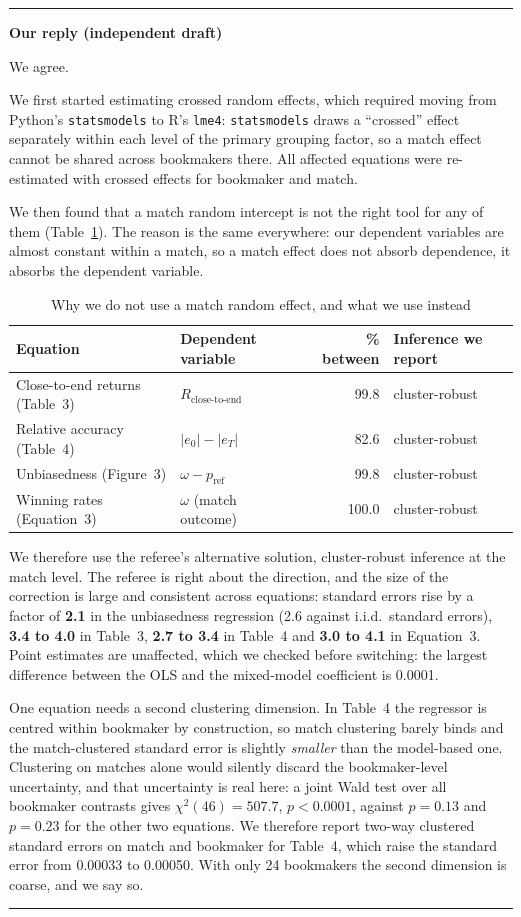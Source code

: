 \documentclass[letterpaper,12pt]{article}
\newcounter{b}
\newenvironment{ourreply}
  {\par\medskip\noindent\textcolor{ourcol}{\rule{\linewidth}{1pt}}%
   \par\nobreak\vspace{3pt}%
   \noindent\textbf{\textcolor{ourcol}{Our reply (independent draft)}}%
   \par\nobreak\vspace{3pt}}
  {\par\vspace{3pt}%
   \noindent\textcolor{ourcol}{\rule{\linewidth}{0.4pt}}\par\medskip}
\begin{document}
\begin{enumerate}
\begin{ourreply}
We agree.

We first started estimating crossed random effects, which
required moving from Python's \texttt{statsmodels} to R's \texttt{lme4}:
\texttt{statsmodels} draws a ``crossed'' effect separately within each level
of the primary grouping factor, so a match effect cannot be shared across
bookmakers there. All affected equations were re-estimated with crossed
effects for bookmaker and match.

We then found that a match random intercept is not the right tool for any of
them (Table~\ref{tab:r1c2}). The reason is the same everywhere: our dependent
variables are almost constant within a match, so a match effect does not
absorb dependence, it absorbs the dependent variable.

\begin{table}[h]
\centering
\caption{Why we do not use a match random effect, and what we use instead}
\label{tab:r1c2}
\small
\begin{tabular}{llrl}
\toprule
Equation & Dependent variable & \% between & Inference we report \\
\midrule
Close-to-end returns (Table~3) & $R_{\text{close-to-end}}$  & 99.8  & cluster-robust \\
Relative accuracy (Table~4)    & $|e_0| - |e_T|$            & 82.6  & cluster-robust \\
Unbiasedness (Figure~3)        & $\omega - p_{\text{ref}}$  & 99.8  & cluster-robust \\
Winning rates (Equation~3)     & $\omega$ (match outcome)   & 100.0 & cluster-robust \\
\bottomrule
\end{tabular}
\end{table}

We therefore use the referee's alternative solution, cluster-robust
inference at the match level. The referee is right about the direction, and
the size of the correction is large and consistent across equations: standard
errors rise by a factor of \textbf{2.1} in the unbiasedness regression (2.6
against i.i.d.\ standard errors), \textbf{3.4 to 4.0} in Table~3, \textbf{2.7
to 3.4} in Table~4 and \textbf{3.0 to 4.1} in Equation~3. Point estimates are
unaffected, which we checked before switching: the largest difference between
the OLS and the mixed-model coefficient is 0.0001.

One equation needs a second clustering dimension. In Table~4 the regressor is
centred within bookmaker by construction, so match clustering barely binds
and the match-clustered standard error is slightly \emph{smaller} than the
model-based one. Clustering on matches alone would silently discard the
bookmaker-level uncertainty, and that uncertainty is real here: a joint Wald
test over all bookmaker contrasts gives $\chi^2(46) = 507.7$, $p < 0.0001$,
against $p = 0.13$ and $p = 0.23$ for the other two equations. We therefore
report two-way clustered standard errors on match and bookmaker for Table~4,
which raise the standard error from 0.00033 to 0.00050. With only 24
bookmakers the second dimension is coarse, and we say so.


\end{ourreply}
\end{enumerate}
\end{document}
